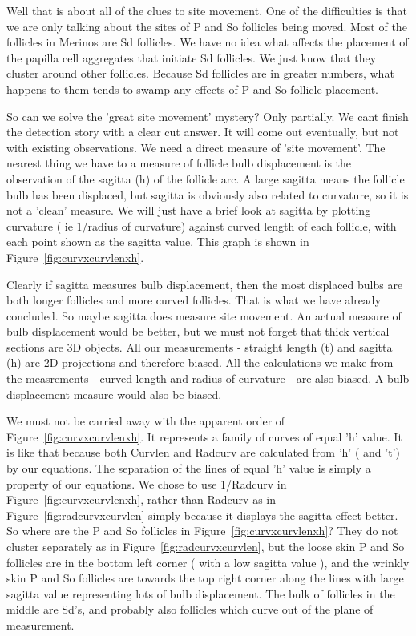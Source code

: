 \documentclass[titlepage]{article}  %
\begin{document}
Well that is about all of the clues to site movement. One of the difficulties is that we are only talking about the sites of P and So follicles being moved. Most of the follicles in Merinos are Sd follicles. We have no idea what affects the placement of the papilla cell aggregates that initiate Sd follicles. We just know that they cluster around other follicles. Because Sd follicles are in greater numbers, what happens to them tends to swamp any effects of P and So follicle placement. 

So can we solve the 'great site movement' mystery? Only partially. We cant finish the detection story with a clear cut answer. It will come out eventually, but not with existing observations. We need a direct measure of 'site movement'. The nearest thing we have to a measure of follicle bulb displacement is the observation of the sagitta (h) of the follicle arc. A large sagitta means the follicle bulb has been displaced, but sagitta is obviously also related to curvature, so it is not a 'clean' measure.  We will just have a brief look at sagitta by plotting curvature ( ie 1/radius of curvature) against curved length of each follicle, with each point shown as the sagitta value. This graph is shown in Figure~\ref{fig:curvxcurvlenxh}.

 Clearly if sagitta measures bulb displacement, then the most displaced bulbs are both longer follicles and more curved follicles. That is what we have already concluded. So maybe sagitta does measure site movement.  An actual measure of bulb displacement would be better, but we must not forget that thick vertical sections are 3D objects. All our measurements - straight length (t) and sagitta (h) are 2D projections and therefore biased. All the calculations we make from the measrements - curved length and radius of curvature - are also biased. A bulb displacement measure would also be biased. 

We must not be carried away with the apparent order of Figure~\ref{fig:curvxcurvlenxh}. It represents a family of curves of equal 'h' value. It is like that because both Curvlen and Radcurv are calculated from 'h' ( and 't') by our equations. The separation of the lines of equal 'h' value is simply a property of our equations. We chose to use 1/Radcurv in Figure~\ref{fig:curvxcurvlenxh}, rather than Radcurv as in Figure~\ref{fig:radcurvxcurvlen} simply because it displays the sagitta effect better. So where are the P and So follicles in Figure~\ref{fig:curvxcurvlenxh}? They do not cluster separately as in Figure~\ref{fig:radcurvxcurvlen}, but the loose skin P and So follicles are in the bottom left corner ( with a low sagitta value ), and the wrinkly skin P and So follicles are towards the top right corner along the lines with large sagitta value representing lots of bulb displacement. The bulk of follicles in the middle are Sd's, and probably also follicles which curve out of the plane of measurement.
\end{document}
